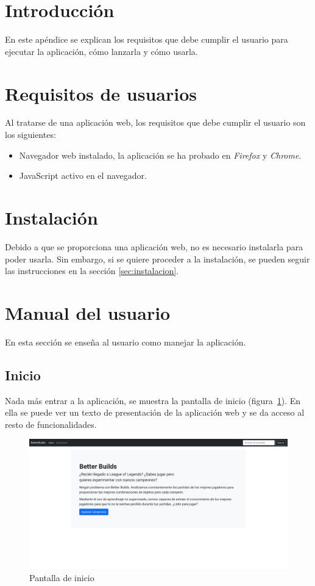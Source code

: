 
\section{Introducción}
En este apéndice se explican los requisitos que debe cumplir el usuario para ejecutar la aplicación, cómo lanzarla y cómo usarla.

\section{Requisitos de usuarios}
Al tratarse de una aplicación web, los requisitos que debe cumplir el usuario son los siguientes:

\begin{itemize}
	\tightlist
	\item Navegador web instalado, la aplicación se ha probado en \textit{Firefox} y \textit{Chrome}.
	\item JavaScript activo en el navegador.
\end{itemize}


\section{Instalación}
Debido a que se proporciona una aplicación web, no es necesario instalarla para poder usarla. Sin embargo, si se quiere proceder a la instalación, se pueden seguir las instrucciones en la sección \ref{sec:instalacion}.


\section{Manual del usuario}
En esta sección se enseña al usuario como manejar la aplicación.

\subsection{Inicio}
Nada más entrar a la aplicación, se muestra la pantalla de inicio (figura~\ref{fig:inicio}). En ella se puede ver un texto de presentación de la aplicación web y se da acceso al resto de funcionalidades.

\begin{figure}[h]
	\centering
	\includegraphics[width=1\linewidth]{img/0.inicio}
	\caption{Pantalla de inicio}
	\label{fig:inicio}
\end{figure}


